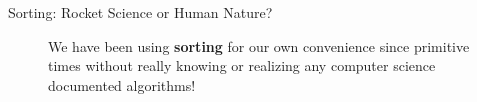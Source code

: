 \documentclass[12pt, aspectratio=54, xcolor=table]{beamer}
\begin{document}
\begin{frame}[label={important}]{Sorting: Rocket Science or Human Nature?}
	\begin{figure}
		\centering
		\qquad
		\caption*{We have been using \textbf{\alert{sorting}} for our own convenience since primitive times without really knowing or realizing any computer science documented algorithms!}
		\label{fig:1}
	\end{figure}
	
\end{frame}
\end{document}
